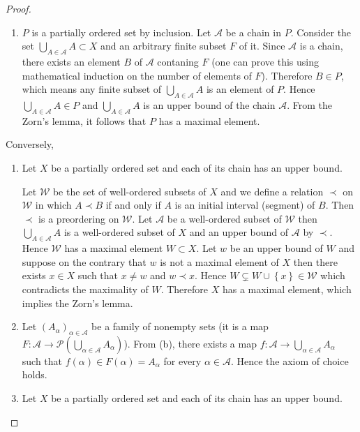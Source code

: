 \begin{proof}
\begin{enumerate}[label={(\alph*)}]
		\item \( P \) is a partially ordered set by inclusion. Let \( \mathcal{A} \) be a chain in \( P \). Consider the set \( \bigcup_{A\in\mathcal{A}} A \subset X \) and an arbitrary finite subset \( F \) of it. Since \( \mathcal{A} \) is a chain, there exists an element \( B \) of \( \mathcal{A} \) contaning \( F \) (one can prove this using mathematical induction on the number of elements of \( F \)). Therefore \( B \in P \), which means any finite subset of \( \bigcup_{A\in\mathcal{A}} A \) is an element of \( P \). Hence \( \bigcup_{A\in\mathcal{A}} A \in P \) and \( \bigcup_{A\in\mathcal{A}} A \) is an upper bound of the chain \( \mathcal{A} \). From the Zorn's lemma, it follows that \( P \) has a maximal element.
	\end{enumerate}

	Conversely,
	\begin{enumerate}[label={(\alph*)}]
		\item Let \( X \) be a partially ordered set and each of its chain has an upper bound.

		      Let \( \mathcal{W} \) be the set of well-ordered subsets of \( X \) and we define a relation \( \prec \) on \( \mathcal{W} \) in which \( A \prec B \) if and only if \( A \) is an initial interval (segment) of \( B \). Then \( \prec \) is a preordering on \( \mathcal{W} \). Let \( \mathscr{A} \) be a well-ordered subset of \( \mathcal{W} \) then \( \bigcup_{A\in \mathscr{A}} A \) is a well-ordered subset of \(X\) and an upper bound of \( \mathscr{A} \) by \( \prec \). Hence \( \mathcal{W} \) has a maximal element \( W \subset X \). Let \( w \) be an upper bound of \( W \) and suppose on the contrary that \( w \) is not a maximal element of \( X \) then there exists \( x \in X \) such that \( x \ne w \) and \( w \prec x \). Hence \( W \subsetneq W \cup \left\{ x \right\} \in \mathcal{W} \) which contradicts the maximality of \( W \). Therefore \( X \) has a maximal element, which implies the Zorn's lemma.
		\item Let \( {(A_{\alpha})}_{\alpha\in\mathscr{A}} \) be a family of nonempty sets (it is a map \( F: \mathscr{A} \to \mathscr{P}\left(\bigcup_{\alpha\in\mathscr{A}} A_{\alpha}\right) \)). From (b), there exists a map \( f: \mathscr{A} \to \bigcup_{\alpha\in\mathscr{A}} A_{\alpha} \) such that \( f(\alpha) \in F(\alpha) = A_{\alpha} \) for every \( \alpha \in \mathscr{A} \). Hence the axiom of choice holds.
		\item Let \( X \) be a partially ordered set and each of its chain has an upper bound.


\end{enumerate}
\end{proof}

